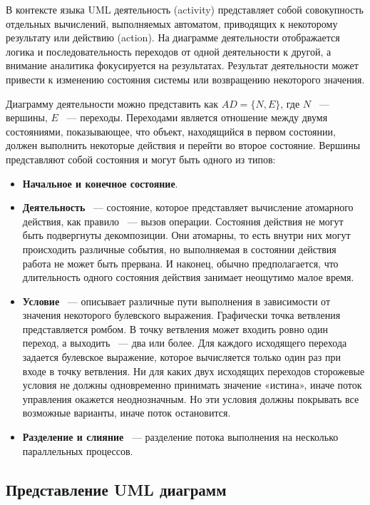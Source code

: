 В контексте языка UML деятельность (activity) представляет собой совокупность отдельных вычислений, выполняемых автоматом, приводящих к некоторому результату или действию (action). На диаграмме деятельности отображается логика и последовательность переходов от одной деятельности к другой, а внимание аналитика фокусируется на результатах. Результат деятельности может привести к изменению состояния системы или возвращению некоторого значения.

Диаграмму деятельности можно представить как $ AD = \{ N, E \} $, где $ N $ ~--- вершины, $ E $ ~--- переходы. Переходами является отношение между двумя состояниями, показывающее, что объект, находящийся в первом состоянии, должен выполнить некоторые действия и перейти во второе состояние. Вершины представляют собой состояния и могут быть одного из типов:
\begin{itemize}
\item \textbf{Начальное и конечное состояние}.
\item \textbf{Деятельность} ~--- состояние, которое представляет вычисление атомарного действия, как правило ~--- вызов операции. Состояния действия не могут быть подвергнуты декомпозиции. Они атомарны, то есть внутри них могут происходить различные события, но выполняемая в состоянии действия работа не может быть прервана. И наконец, обычно предполагается, что длительность одного состояния действия занимает неощутимо малое время.
\item \textbf{Условие} ~--- описывает различные пути выполнения в зависимости от значения некоторого булевского выражения. Графически точка ветвления представляется ромбом. В точку ветвления может входить ровно один переход, а выходить ~--- два или более. Для каждого исходящего перехода задается булевское выражение, которое вычисляется только один раз при входе в точку ветвления. Ни для каких двух исходящих переходов сторожевые условия не должны одновременно принимать значение «истина», иначе поток управления окажется неоднозначным. Но эти условия должны покрывать все возможные варианты, иначе поток остановится.
\item \textbf{Разделение и слияние} ~--- разделение потока выполнения на несколько параллельных процессов.
\end{itemize}

\subsection{Представление UML диаграмм}

